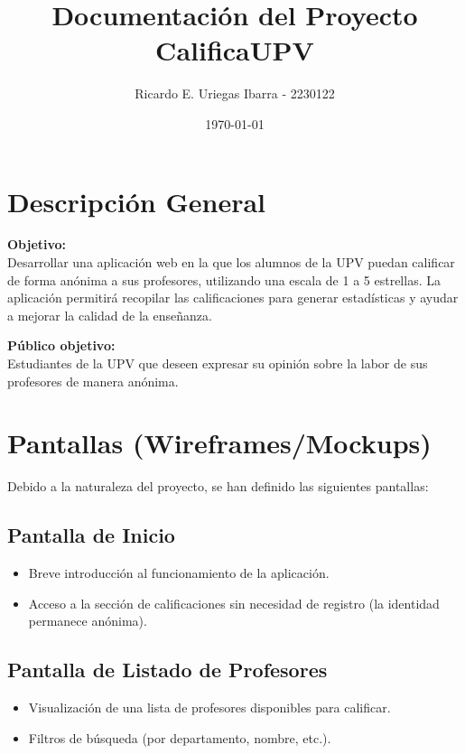\documentclass[11pt]{article}
\title{Documentación del Proyecto CalificaUPV}
\author{Ricardo E. Uriegas Ibarra - 2230122}
\date{\today}
\begin{document}
\maketitle
\tableofcontents
\newpage

\section{Descripción General}

\textbf{Objetivo:} \\
Desarrollar una aplicación web en la que los alumnos de la UPV puedan calificar de forma anónima a sus profesores, utilizando una escala de 1 a 5 estrellas. La aplicación permitirá recopilar las calificaciones para generar estadísticas y ayudar a mejorar la calidad de la enseñanza.

\bigskip
\textbf{Público objetivo:} \\
Estudiantes de la UPV que deseen expresar su opinión sobre la labor de sus profesores de manera anónima.

\section{Pantallas (Wireframes/Mockups)}

Debido a la naturaleza del proyecto, se han definido las siguientes pantallas:

\subsection{Pantalla de Inicio}
\begin{itemize}
    \item Breve introducción al funcionamiento de la aplicación.
    \item Acceso a la sección de calificaciones sin necesidad de registro (la identidad permanece anónima).
\end{itemize}

\subsection{Pantalla de Listado de Profesores}
\begin{itemize}
    \item Visualización de una lista de profesores disponibles para calificar.
    \item Filtros de búsqueda (por departamento, nombre, etc.).
\end{itemize}
\end{document}
